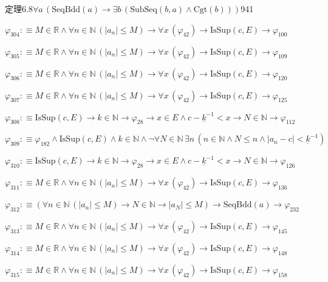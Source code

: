 \begin{fullproof}{定理6.8}{$\forall a\,(\mathrm{SeqBdd}(a) \to \exists b\,(\mathrm{SubSeq}(b,a) \land \mathrm{Cgt}(b)))$}{941}
\begin{abbrevlist}
\item $\varphi_{304} :\equiv M \in \mathbb{R} \land \forall n \in \mathbb{N}\,(\lvert a_{n} \rvert \leq M) \to \forall x\,(\varphi_{42}) \to \mathrm{IsSup}(c,E) \to \varphi_{100}$
\item $\varphi_{305} :\equiv M \in \mathbb{R} \land \forall n \in \mathbb{N}\,(\lvert a_{n} \rvert \leq M) \to \forall x\,(\varphi_{42}) \to \mathrm{IsSup}(c,E) \to \varphi_{109}$
\item $\varphi_{306} :\equiv M \in \mathbb{R} \land \forall n \in \mathbb{N}\,(\lvert a_{n} \rvert \leq M) \to \forall x\,(\varphi_{42}) \to \mathrm{IsSup}(c,E) \to \varphi_{120}$
\item $\varphi_{307} :\equiv M \in \mathbb{R} \land \forall n \in \mathbb{N}\,(\lvert a_{n} \rvert \leq M) \to \forall x\,(\varphi_{42}) \to \mathrm{IsSup}(c,E) \to \varphi_{125}$
\item $\varphi_{308} :\equiv \mathrm{IsSup}(c,E) \to k \in \mathbb{N} \to \varphi_{28} \to x \in E \land c - \underline{k}^{-1} < x \to N \in \mathbb{N} \to \varphi_{112}$
\item $\varphi_{309} :\equiv \varphi_{182} \land \mathrm{IsSup}(c,E) \land k \in \mathbb{N} \land \neg \forall N \in \mathbb{N}\,\exists n\,(n \in \mathbb{N} \land N \leq n \land \lvert a_{n} - c \rvert < \underline{k}^{-1})$
\item $\varphi_{310} :\equiv \mathrm{IsSup}(c,E) \to k \in \mathbb{N} \to \varphi_{28} \to x \in E \land c - \underline{k}^{-1} < x \to N \in \mathbb{N} \to \varphi_{126}$
\item $\varphi_{311} :\equiv M \in \mathbb{R} \land \forall n \in \mathbb{N}\,(\lvert a_{n} \rvert \leq M) \to \forall x\,(\varphi_{42}) \to \mathrm{IsSup}(c,E) \to \varphi_{136}$
\item $\varphi_{312} :\equiv (\forall n \in \mathbb{N}\,(\lvert a_{n} \rvert \leq M) \to N \in \mathbb{N} \to \lvert a_{N} \rvert \leq M) \to \mathrm{SeqBdd}(a) \to \varphi_{232}$
\item $\varphi_{313} :\equiv M \in \mathbb{R} \land \forall n \in \mathbb{N}\,(\lvert a_{n} \rvert \leq M) \to \forall x\,(\varphi_{42}) \to \mathrm{IsSup}(c,E) \to \varphi_{145}$
\item $\varphi_{314} :\equiv M \in \mathbb{R} \land \forall n \in \mathbb{N}\,(\lvert a_{n} \rvert \leq M) \to \forall x\,(\varphi_{42}) \to \mathrm{IsSup}(c,E) \to \varphi_{148}$
\item $\varphi_{315} :\equiv M \in \mathbb{R} \land \forall n \in \mathbb{N}\,(\lvert a_{n} \rvert \leq M) \to \forall x\,(\varphi_{42}) \to \mathrm{IsSup}(c,E) \to \varphi_{158}$

\end{abbrevlist}
\end{fullproof}
